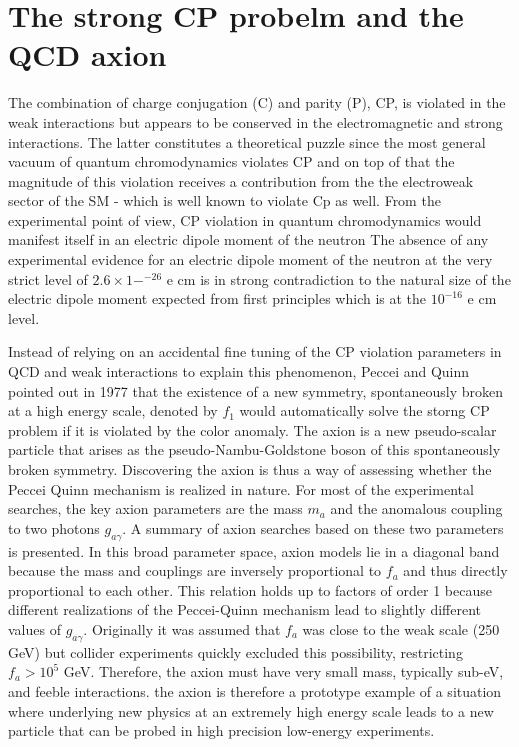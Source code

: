\documentclass[11pt]{book}
\begin{document}
\section{The strong CP probelm and the QCD axion}
The combination of charge conjugation (C) and parity (P), CP, is violated in the weak interactions but appears to be conserved in the electromagnetic and strong interactions. The latter constitutes a theoretical puzzle since the most general vacuum of quantum chromodynamics violates CP and on top of that the magnitude of this violation receives a contribution from the the electroweak sector of the SM - which is well known to violate Cp as well. From the experimental point of view, CP violation in quantum chromodynamics would manifest itself in an electric dipole moment of the neutron The absence of any experimental evidence for an electric dipole moment of the neutron at the very strict level of $2.6\times1-^{-26}$ e cm is in strong contradiction to the natural size of the electric dipole moment expected from first principles which is at the $10^{-16}$ e cm level.

Instead of relying on an accidental fine tuning of the CP violation parameters in QCD and weak interactions to explain this phenomenon, Peccei and Quinn pointed out in  1977 that the existence of a new symmetry, spontaneously broken at a high energy scale, denoted by $f_1$ would automatically solve the storng CP problem if it is violated by the color anomaly. The axion is a new pseudo-scalar particle that arises as the pseudo-Nambu-Goldstone boson of this spontaneously broken symmetry. Discovering the axion is thus a way of assessing whether the Peccei Quinn mechanism is realized in nature. For most of the experimental searches, the key axion parameters are the mass $m_a$ and the anomalous coupling to two photons $g_{a\gamma}$. A summary of axion searches based on these two parameters is presented. In this broad parameter space, axion models lie in a diagonal band because the mass and couplings are inversely proportional to $f_a$ and thus directly proportional to each other. This relation holds up to factors of order 1 because different realizations of the Peccei-Quinn mechanism lead to slightly different values of $g_{a\gamma}$.
Originally it was assumed that $f_a$ was close to the weak scale (250 GeV) but collider experiments quickly excluded this possibility, restricting $f_a > 10^5$ GeV. Therefore, the axion must have very small mass, typically sub-eV, and feeble interactions. the axion is therefore a prototype example of a situation where underlying new physics at an extremely high energy scale leads to a new particle that can be probed in high precision low-energy experiments.
\end{document}
